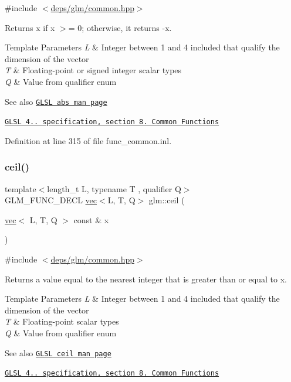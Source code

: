 {\ttfamily \#include $<$\hyperlink{common_8hpp}{deps/glm/common.\+hpp}$>$}

Returns x if x $>$= 0; otherwise, it returns -\/x.


\begin{DoxyTemplParams}{Template Parameters}
{\em L} & Integer between 1 and 4 included that qualify the dimension of the vector \\
\hline
{\em T} & Floating-\/point or signed integer scalar types \\
\hline
{\em Q} & Value from qualifier enum\\
\hline
\end{DoxyTemplParams}
\begin{DoxySeeAlso}{See also}
\href{http://www.opengl.org/sdk/docs/manglsl/xhtml/abs.xml}{\tt G\+L\+SL abs man page} 

\href{http://www.opengl.org/registry/doc/GLSLangSpec.4.20.8.pdf}{\tt G\+L\+SL 4.. specification, section 8. Common Functions} 
\end{DoxySeeAlso}


Definition at line 315 of file func\+\_\+common.\+inl.

\mbox{\label{group__core__func__common_gafb9d2a645a23aca12d4d6de0104b7657}} 
\subsubsection{\texorpdfstring{ceil()}{ceil()}}
{\footnotesize\ttfamily template$<$length\+\_\+t L, typename T , qualifier Q$>$ \\
G\+L\+M\+\_\+\+F\+U\+N\+C\+\_\+\+D\+E\+CL \hyperlink{structglm_1_1vec}{vec}$<$L, T, Q$>$ glm\+::ceil (\begin{DoxyParamCaption}\item[{\hyperlink{structglm_1_1vec}{vec}$<$ L, T, Q $>$ const \&}]{x }\end{DoxyParamCaption})}



{\ttfamily \#include $<$\hyperlink{common_8hpp}{deps/glm/common.\+hpp}$>$}

Returns a value equal to the nearest integer that is greater than or equal to x.


\begin{DoxyTemplParams}{Template Parameters}
{\em L} & Integer between 1 and 4 included that qualify the dimension of the vector \\
\hline
{\em T} & Floating-\/point scalar types \\
\hline
{\em Q} & Value from qualifier enum\\
\hline
\end{DoxyTemplParams}
\begin{DoxySeeAlso}{See also}
\href{http://www.opengl.org/sdk/docs/manglsl/xhtml/ceil.xml}{\tt G\+L\+SL ceil man page} 

\href{http://www.opengl.org/registry/doc/GLSLangSpec.4.20.8.pdf}{\tt G\+L\+SL 4.. specification, section 8. Common Functions} 
\end{DoxySeeAlso}


